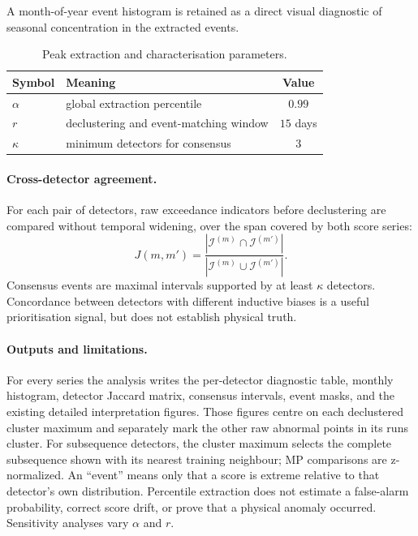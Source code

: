 A month-of-year event histogram is retained as a direct visual diagnostic of
seasonal concentration in the extracted events.

\begin{table}[t]
  \centering
  \caption{Peak extraction and characterisation parameters.}
  \label{tab:peak-params}
  \begin{tabular}{llc}
    \toprule
    Symbol & Meaning & Value \\
    \midrule
    $\alpha$ & global extraction percentile & $0.99$ \\
    $r$      & declustering and event-matching window & $15$ days \\
    $\kappa$ & minimum detectors for consensus & $3$ \\
    \bottomrule
  \end{tabular}
\end{table}

\paragraph{Cross-detector agreement.}
For each pair of detectors, raw exceedance indicators before declustering are
compared without temporal widening, over the span covered by both score series:
\begin{equation}
  J(m,m') =
  \frac{|\mathcal{I}^{(m)} \cap \mathcal{I}^{(m')}|}
       {|\mathcal{I}^{(m)} \cup \mathcal{I}^{(m')}|}.
\end{equation}
Consensus events are maximal intervals supported by at least $\kappa$
detectors. Concordance between detectors with different inductive biases is a
useful prioritisation signal, but does not establish physical truth.

\paragraph{Outputs and limitations.}
For every series the analysis writes the per-detector diagnostic table, monthly
histogram, detector Jaccard matrix, consensus intervals, event masks, and the
existing detailed interpretation figures. Those figures centre on each
declustered cluster maximum and separately mark the other raw abnormal points
in its runs cluster. For subsequence detectors, the cluster maximum selects the
complete subsequence shown with its nearest training neighbour; MP comparisons
are z-normalized. An ``event'' means only that a score
is extreme relative to that detector's own distribution. Percentile extraction
does not estimate a false-alarm probability, correct score drift, or prove that
a physical anomaly occurred. Sensitivity analyses vary $\alpha$ and $r$.
